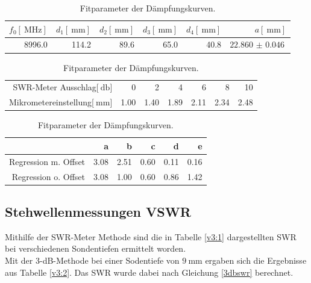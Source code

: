 \begin{table}
\centering
\begin{tabular}{r r r r r r}
	$f_\text{0}[\SI{}{\mega\hertz}]$ & $d_\text{1}[\SI{}{\milli\meter}]$ & $d_\text{2}[\SI{}{\milli\meter}]$ & $d_\text{3}[\SI{}{\milli\meter}]$ & $d_\text{4}[\SI{}{\milli\meter}]$ & $a[\SI{}{\milli\meter}]$\\
	\hline
	\hline
	8996.0 & 114.2 & 89.6 & 65.0 & 40.8 & $\SI{22.860(46)}{}$\\
	\hline
\end{tabular}
\caption{Messwerte zur Bestimmung der Klystronfrequenz.}
\label{v2:1}
\begin{tabular}{r|r r r r r r|}
	SWR-Meter Ausschlag[$\SI{}{\decibel}$] & 0 & 2 & 4 & 6 & 8 & 10\\
	Mikrometereinstellung[$\SI{}{\milli\meter}$] & 1.00 & 1.40 & 1.89 & 2.11 & 2.34 & 2.48\\
\end{tabular}
\caption{Messwerte zur Bestimmung Dämpfungskurve.}
\label{v2:2}
\begin{tabular}{r r r r r r}
	 & a & b & c & d & e\\
	\hline
	\hline
	Regression m. Offset & 3.08 & 2.51 & 0.60 & 0.11 & 0.16\\
	Regression o. Offset & 3.08 & 1.00 & 0.60 & 0.86 & 1.42\\
	\hline
\end{tabular}
\caption{Fitparameter der Dämpfungskurven.}
\label{v2:3}
\end{table}

\FloatBarrier

\subsection{Stehwellenmessungen VSWR} %
\label{sec:stehwellenmessungen_vswr}

Mithilfe der SWR-Meter Methode sind die in Tabelle \ref{v3:1} dargestellten SWR bei verschiedenen Sondentiefen ermittelt worden.\\

Mit der 3-dB-Methode bei einer Sodentiefe von $\SI{9}{\milli\meter}$ ergaben sich die Ergebnisse aus Tabelle \ref{v3:2}.
Das SWR wurde dabei nach Gleichung \eqref{3dbswr} berechnet.\\


